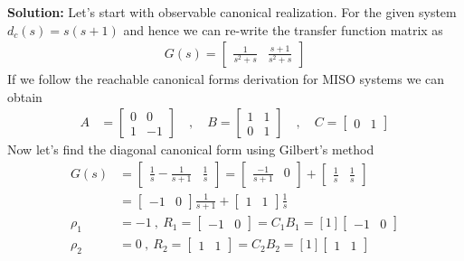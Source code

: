 \documentclass[twoside]{article}
\begin{document}
\textbf{Solution:} Let's start with observable canonical realization. For the given system $d_c(s) = s(s+1)$ and hence we can re-write the 
transfer function matrix as
%
\begin{align*}
	G(s) =  \left[ \begin{array}{cc} \frac{ 1 }{ s^2 + s }  
	       &  \frac{ s+1 }{ s^2 + s}   \end{array} \right] 
\end{align*}
%  
If we follow the reachable canonical forms derivation for MISO systems we can obtain
%
%
\begin{align*}
A &= \left[ \begin{array}{ccc} 0 & 0 \\ 1 & -1  \end{array} \right]
\quad , \quad 
B = \left[ \begin{array}{cc} 1 & 1 \\  0 & 1 \end{array} \right]
\quad , \quad 
	C = \left[ \begin{array}{cc} 0  & 1  \end{array} \right]
\end{align*}
% 
Now let's find the diagonal canonical form using Gilbert's method
\begin{align*}
	G(s) &=  \left[ \begin{array}{cc} \frac{ 1 }{ s }  - \frac{ 1 }{ s + 1 }  &  \frac{ 1 }{ s }  \end{array} \right]  = 
	\left[ \begin{array}{cc} \frac{ -1 }{ s + 1 }  & 0  \end{array} \right]  
	+ \left[ \begin{array}{cc} \frac{ 1 }{ s }  & \frac{ 1 }{ s }  \end{array} \right] 
	\\ &= \left[ \begin{array}{cc} -1 & 0  \end{array} \right] \frac{ 1 }{ s + 1 }  + \left[ \begin{array}{cc} 1 & 1  \end{array} \right] \frac{ 1 }{ s }  
	     \\
	    \rho_1 & = -1 \ , \ R_1 = \left[ \begin{array}{cc} -1
	       & 0  \end{array} \right] = C_1 B_1 = [1] \left[ \begin{array}{cc} -1
	       & 0  \end{array} \right] 
	       \\
	       	     \rho_2 & = 0 \ , \ R_2 = \left[ \begin{array}{cc} 1
	       & 1  \end{array} \right] = C_2 B_2 = [1] \left[ \begin{array}{cc} 1
	       & 1  \end{array} \right] 
\end{align*}
\end{document}
